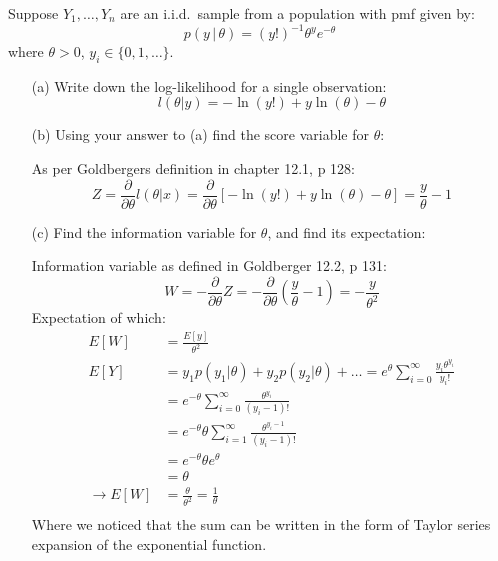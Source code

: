 \documentclass{article}
\newcommand{\1}{\mathbf{1}}
\begin{document}
Suppose $Y_1,\ldots, Y_n$ are an i.i.d.~sample from a population with pmf given by:
\begin{equation}
    p(y\, |\, \theta) = (y!)^{-1} \theta^y e^{-\theta} 
\end{equation}
where {$\theta > 0$}, $y_i \in \{0,1,\ldots \}$.
\begin{itemize}
    \item[(a)] Write down the log-likelihood for a single observation:
    $$l(\theta|y) = -\ln(y!) + y\ln(\theta) - \theta$$

    \item[(b)] Using your answer to (a) find the score variable for $\theta$:
    
    As per Goldbergers definition in chapter 12.1, p 128:
    $$ Z = \frac{\partial}{\partial\theta} l(\theta|x) = \frac{\partial}{\partial\theta}\left[  -\ln(y!) + y\ln(\theta) - \theta  \right] = \frac{y}{\theta} -1$$

    \item[(c)] Find the information variable for $\theta$, and find its expectation:
    
    Information variable as defined in Goldberger 12.2, p 131:
    $$W = -\frac{\partial}{\partial\theta} Z = -\frac{\partial}{\partial\theta } \left(\frac{y}{\theta} -1\right) = - \frac{y}{\theta^2}$$
    Expectation of which:
    \begin{align*}
        E[W] &= \frac{E[y]}{\theta^2} \\
        E[Y] &= y_1p(y_1|\theta) + y_2p(y_2|\theta) + \hdots = e^\theta \sum_{i=0}^\infty \frac{y_i\theta^{y_i}}{y_i!} \\
        &= e^{-\theta} \sum_{i=0}^\infty \frac{\theta^{y_i}}{(y_i-1)!} \\
        &= e^{-\theta} \theta \sum_{i=1}^\infty \frac{\theta^{y_i-1}}{(y_i-1)!} \\
        &= e^{-\theta} \theta e^\theta \\
        &= \theta \\
        \rightarrow  E[W] &= \frac{\theta}{\theta^2} = \frac{1}{\theta}\\
    \end{align*}
    Where we noticed that the sum can be written in the form of Taylor series expansion of the exponential function. 


\end{itemize}
\end{document}
